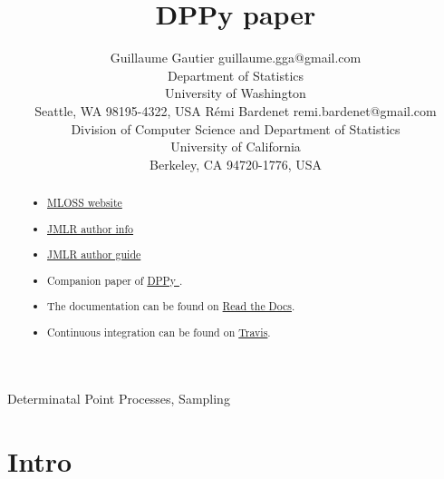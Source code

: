 \documentclass[twoside,11pt]{article}
\begin{document}
\title{DPPy paper}

\author{\name Guillaume Gautier \email guillaume.gga@gmail.com \\
       \addr Department of Statistics\\
       University of Washington\\
       Seattle, WA 98195-4322, USA
       \AND
       \name R\'emi Bardenet \email remi.bardenet@gmail.com \\
       \addr Division of Computer Science and Department of Statistics\\
       University of California\\
       Berkeley, CA 94720-1776, USA}

\editor{}

\maketitle

\begin{abstract}%

  \begin{itemize}
    \item \href{http://www.jmlr.org/mloss/mloss-info.html}{MLOSS website}
    \item \href{http://jmlr.csail.mit.edu/author-info.html}{JMLR author info}
    \item \href{http://www.jmlr.org/format/authors-guide.html}{JMLR author guide} 
  \end{itemize}

  \begin{itemize}
    \item Companion paper of \href{https://github.com/guilgautier/DPPy}{DPPy \faGithub}.
    \item The documentation can be found on \href{https://dppy.readthedocs.io/en/latest/?badge=latest}{Read the Docs}.
    \item Continuous integration can be found on \href{https://travis-ci.com/guilgautier/DPPy}{Travis}.
  \end{itemize}
  
\end{abstract}

\begin{keywords}
  Determinatal Point Processes, Sampling
\end{keywords}

\section{Intro} %
\label{sec:intro}
\end{document}
